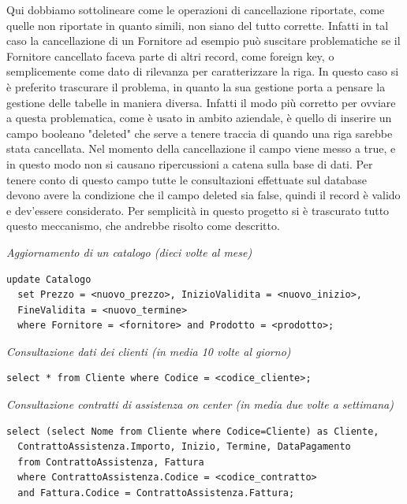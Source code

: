 \newline
Qui dobbiamo sottolineare come le operazioni di cancellazione riportate, come quelle non riportate in quanto simili, non siano del tutto corrette. Infatti in tal caso la cancellazione di un Fornitore ad esempio può suscitare problematiche se il Fornitore cancellato faceva parte di altri record, come foreign key, o semplicemente come dato di rilevanza per caratterizzare la riga. In questo caso si è preferito trascurare il problema, in quanto la sua gestione porta a pensare la gestione delle tabelle in maniera diversa. Infatti il modo più corretto per ovviare a questa problematica, come è usato in ambito aziendale, è quello di inserire un campo booleano "deleted" che serve a tenere traccia di quando una riga sarebbe stata cancellata. Nel momento della cancellazione il campo viene messo a true, e in questo modo non si causano ripercussioni a catena sulla base di dati. Per tenere conto di questo campo tutte le consultazioni effettuate sul database devono avere la condizione che il campo deleted sia false, quindi il record è valido e dev'essere considerato. Per semplicità in questo progetto si è trascurato tutto questo meccanismo, che andrebbe risolto come descritto.

\noindent\textit{Aggiornamento di un catalogo (dieci volte al mese)}
\begin{verbatim}
update Catalogo
  set Prezzo = <nuovo_prezzo>, InizioValidita = <nuovo_inizio>,
  FineValidita = <nuovo_termine>
  where Fornitore = <fornitore> and Prodotto = <prodotto>;
\end{verbatim}
\vspace{1cm}

\noindent\textit{Consultazione dati dei clienti (in media 10 volte al giorno)}
\begin{verbatim}
select * from Cliente where Codice = <codice_cliente>;
\end{verbatim}
\vspace{1cm}

\noindent\textit{Consultazione contratti di assistenza on center (in media due volte a settimana)}
\begin{verbatim}
select (select Nome from Cliente where Codice=Cliente) as Cliente,
  ContrattoAssistenza.Importo, Inizio, Termine, DataPagamento
  from ContrattoAssistenza, Fattura
  where ContrattoAssistenza.Codice = <codice_contratto>
  and Fattura.Codice = ContrattoAssistenza.Fattura;
\end{verbatim}
\vspace{1cm}

